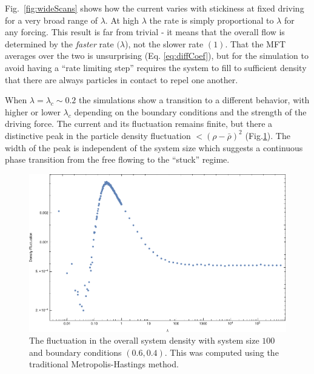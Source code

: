 \documentclass[
reprint, amsmath,amssymb,
]{revtex4-1}
\begin{document}
Fig.~\ref{fig:wideScans} shows how the current varies with stickiness
at fixed driving for a very broad range of $\lambda$.  At high $\lambda$ the rate is simply proportional
to $\lambda$ for any forcing.  This result is far from trivial - it
means that the overall flow is determined by the {\it faster} rate
$(\lambda$), not the slower rate $(1)$.  That the MFT averages over the
two is unsurprising (Eq. \ref{eq:diffCoef}), but for the
simulation to avoid having a ``rate limiting step'' requires the
system to fill to sufficient density that there are always particles
in contact to repel one another.

When $\lambda = \lambda_c\sim0.2$ the simulations show a transition to a different
behavior, with higher or lower $\lambda_c$ depending on the boundary conditions and the strength of the driving force.
The current and its fluctuation remains finite, but there a distinctive peak in the particle density fluctuation
$<(\rho-\bar{\rho})^2$ (Fig.\ref{fig:DenFluc}).  The width of the peak is independent of the
system size 
which suggests a continuous
phase transition from the free flowing to the ``stuck'' regime.

\begin{figure}[h!]
\vspace{0em}
\begin{center}
    \includegraphics[width=1\linewidth]{logDensityFluc}
\end{center}
    \vspace{-0em}
\caption{\label{fig:DenFluc} The fluctuation in the overall system density with system size $100$ and boundary conditions $(0.6, 0.4)$. This was computed using the traditional Metropolis-Hastings method. }
\end{figure}
\end{document}
